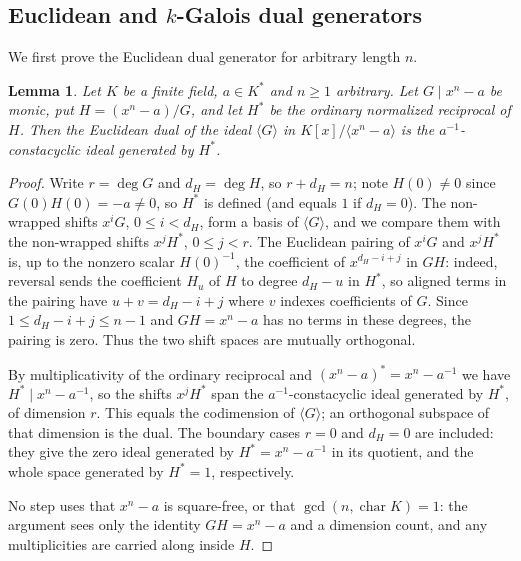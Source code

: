 \documentclass[preprint,12pt,a4paper]{elsarticle}
\newtheorem{lemma}[theorem]{Lemma}
\theoremstyle{definition}
\theoremstyle{remark}
\begin{document}
\subsection{Euclidean and \texorpdfstring{$k$}{k}-Galois dual
generators}\label{sec:dual-generators}

We first prove the Euclidean dual generator for arbitrary length $n$.

\begin{lemma}\label{lem:euclidean-dual}
Let $K$ be a finite field, $a\in K^\ast$ and $n\geq1$ arbitrary.  Let
$G\mid x^n-a$ be monic, put $H=(x^n-a)/G$, and let $H^\ast$ be the ordinary
normalized reciprocal of $H$.  Then the Euclidean dual of the ideal
$\langle G\rangle$ in $K[x]/\langle x^n-a\rangle$ is the
$a^{-1}$-constacyclic ideal generated by $H^\ast$.
\end{lemma}

\begin{proof}
Write $r=\deg G$ and $d_H=\deg H$, so $r+d_H=n$; note $H(0)\neq0$ since
$G(0)H(0)=-a\neq0$, so $H^\ast$ is defined (and equals $1$ if $d_H=0$).  The
non-wrapped shifts $x^iG$, $0\leq i<d_H$, form a basis of $\langle G\rangle$,
and we compare them with the non-wrapped shifts $x^jH^\ast$, $0\leq j<r$.  The
Euclidean pairing of $x^iG$ and $x^jH^\ast$ is, up to the nonzero scalar
$H(0)^{-1}$, the coefficient of $x^{d_H-i+j}$ in $GH$: indeed, reversal sends
the coefficient $H_u$ of $H$ to degree $d_H-u$ in $H^\ast$, so aligned terms in
the pairing have $u+v=d_H-i+j$ where $v$ indexes coefficients of $G$.  Since
$1\leq d_H-i+j\leq n-1$ and $GH=x^n-a$ has no terms in these degrees, the
pairing is zero.  Thus the two shift spaces are mutually orthogonal.

By multiplicativity of the ordinary reciprocal and
$(x^n-a)^\ast=x^n-a^{-1}$ we have $H^\ast\mid x^n-a^{-1}$, so the shifts
$x^jH^\ast$ span the $a^{-1}$-constacyclic ideal generated by $H^\ast$, of
dimension $r$.  This equals the codimension of $\langle G\rangle$; an
orthogonal subspace of that dimension is the dual.  The boundary cases
$r=0$ and $d_H=0$ are included: they give the zero ideal generated by
$H^\ast=x^n-a^{-1}$ in its quotient, and the whole space generated by
$H^\ast=1$, respectively.

No step uses that $x^n-a$ is square-free, or that $\gcd(n,\operatorname{char}K)=1$:
the argument sees only the identity $GH=x^n-a$ and a dimension count, and any
multiplicities are carried along inside $H$.
\end{proof}
\end{document}
